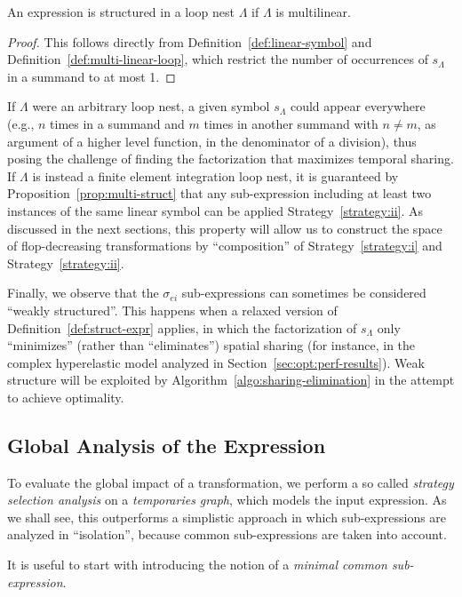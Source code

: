 \begin{Prop}
\label{prop:multi-struct}
An expression is structured in a loop nest $\Lambda$ if $\Lambda$ is multilinear.
\end{Prop}
\begin{proof}
This follows directly from Definition~\ref{def:linear-symbol} and Definition~\ref{def:multi-linear-loop}, which restrict the number of occurrences of $s_{\Lambda}$ in a summand to at most 1.
\end{proof}
If $\Lambda$ were an arbitrary loop nest, a given symbol $s_{\Lambda}$ could appear everywhere (e.g., $n$ times in a summand and $m$ times in another summand with $n \neq m$, as argument of a higher level function, in the denominator of a division), thus posing the challenge of finding the factorization that maximizes temporal sharing. If $\Lambda$ is instead a finite element integration loop nest, it is guaranteed by Proposition~\ref{prop:multi-struct} that any sub-expression including at least two instances of the same linear symbol can be applied Strategy~\ref{strategy:ii}. As discussed in the next sections, this property will allow us to construct the space of flop-decreasing transformations by ``composition'' of Strategy~\ref{strategy:i} and Strategy~\ref{strategy:ii}.

Finally, we observe that the $\sigma_{ei}$ sub-expressions can sometimes be considered ``weakly structured''. This happens when a relaxed version of Definition~\ref{def:struct-expr} applies, in which the factorization of $s_{\Lambda}$ only ``minimizes'' (rather than ``eliminates'') spatial sharing (for instance, in the complex hyperelastic model analyzed in Section~\ref{sec:opt:perf-results}). Weak structure will be exploited by Algorithm~\ref{algo:sharing-elimination} in the attempt to achieve optimality.


\subsection{Global Analysis of the Expression}
\label{sec:opt:driving-se}
To evaluate the global impact of a transformation, we perform a so called {\em strategy selection analysis} on a {\em temporaries graph}, which models the input expression. As we shall see, this outperforms a simplistic approach in which sub-expressions are analyzed in ``isolation'', because common sub-expressions are taken into account.

It is useful to start with introducing the notion of a {\em minimal common sub-expression}.

